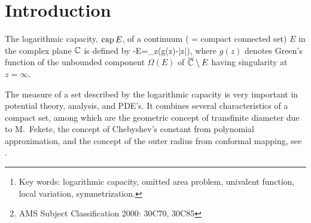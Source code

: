 \newcommand{\ph}{\varphi}
\newcommand{\varph}{\varphi}
\newcommand{\C}{{\Bbb {C}}}
\newcommand{\CC}{\overline{\C}}
\newcommand{\U}{{\Bbb{U}}}
\newcommand{\CU}{\overline{\U}}
\newcommand{\th}{\theta}
\newcommand{\var}{\varphi}
\newcommand{\al}{\alpha}
\newcommand{\T}{{\Bbb{T}}}
\newcommand{\N}{{\Bbb{N}}}

\newcommand{\R}{{\Bbb{R}}}
\newcommand{\CR}{\overline{\R}}

\newcommand{\II}{\int\!\!\int}

\maketitle


\begin{abstract}
We prove a sharp lower bound of the form $\CAP E\ge (1/2)\diam E \cdot \Psi(\area E/((\pi/4) \diam^2 E))$ for the logarithmic capacity 
of a compact connected planar set $E$ in terms of its area and diameter. 
Our lower bound includes as special cases G.~Faber's inequality
$\CAP E\ge \diam E/4$ and G.~P{\' o}lya's inequality $\CAP E\ge (\area E/\pi)^{1/2}$. 
We give explicit formulations, functions of $(1/2)\diam E$, for the extremal domains which we identify.
~\footnote{Key words: logarithmic capacity,  omitted area
problem,  univalent function,  local variation, symmetrization.}
~\footnote{AMS Subject Classification 2000: 30C70, 30C85}

\end{abstract}



\section{Introduction}

The logarithmic capacity, ${\rm cap}\, E$, of a continuum ( = compact connected set) $E$ in the complex plane $\C$ is defined
by
\be
-\log \CAP E=\lim_{z\to \infty}(g(z)-\log |z|),
\ee
where $g(z)$ denotes Green's function of the unbounded component $\Omega(E)$ 
of $\CC\setminus E$ having singularity at $z=\infty$.

The measure of a set described by the logarithmic capacity is very important in potential theory, analysis,
and PDE's. It combines several characteristics of a compact set, among which are the geometric
concept of transfinite diameter due to M.~Fekete, the concept of Chebyshev's constant from
polynomial approximation, and the concept of the outer radius from conformal mapping, see \cite{D,Du,G,H}.

